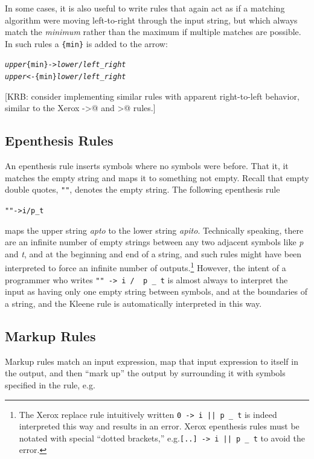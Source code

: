 \documentclass[letterpaper,12pt]{article}
\begin{document}
In some cases, it is also useful to write rules that again act as if a matching algorithm were moving left-to-right
through the input string, but which always match the \emph{minimum} rather than the maximum if multiple matches are
possible.  In such rules a \verb!{min}! is added to the arrow:

\begin{alltt}
\emph{upper} \{min\}-> \emph{lower} / \emph{left} _ \emph{right}
\emph{upper} <-\{min\} \emph{lower} / \emph{left} _ \emph{right}
\end{alltt}

[KRB:  consider implementing similar rules with apparent right-to-left behavior, similar to the Xerox ->@ and >@ rules.]


\subsection{Epenthesis Rules}

An epenthesis rule inserts symbols where no symbols were before.  That it, it matches the empty string and maps it to
something not empty.  Recall that empty double quotes, \verb!""!, denotes the empty string.  The following epenthesis rule

\begin{alltt}
"" -> i /  p _ t
\end{alltt}

\noindent
maps the upper string \emph{apto} to the lower string \emph{apito}.  Technically speaking, there are an infinite number
of empty strings between any two adjacent symbols like \emph{p} and \emph{t}, and at the beginning and end of a string, and such rules might have been interpreted to force
an infinite number of outputs.\footnote{The Xerox replace rule intuitively written \verb!0 -> i || p _ t! is indeed interpreted this
way and results in an error.  Xerox epenthesis rules must be notated with special ``dotted brackets,'' 
e.g.\@ \verb![..] -> i || p _ t! to avoid the error.}  However, the intent of a programmer who writes \verb!"" -> i /  p _ t! is almost always to
interpret the input as having only one empty string between symbols, and at the boundaries of a string, and the Kleene rule is automatically interpreted in this way.


\subsection{Markup Rules}

Markup rules match an input expression, map that input expression to itself in the output, and then ``mark up'' the
output by surrounding it with symbols specified in the rule, e.g.
\end{document}
